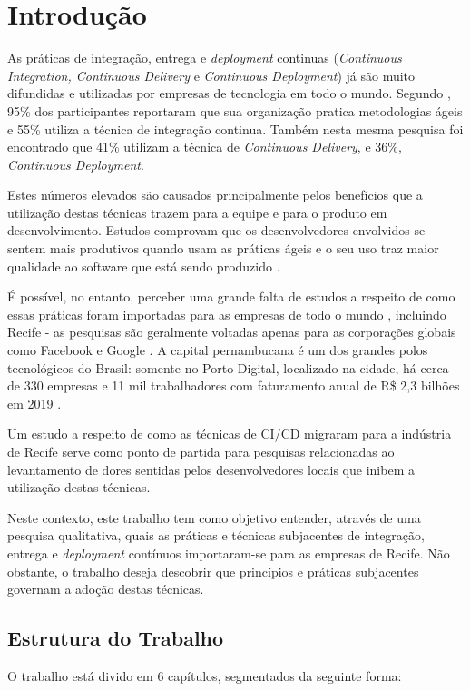 
\chapter{Introdução}

As práticas de integração, entrega e \emph{deployment} continuas (\emph{Continuous Integration, Continuous Delivery} e \emph{Continuous Deployment}) já são muito difundidas e utilizadas por empresas de tecnologia em todo o mundo. Segundo \cite{stateAgileReport2020}, 95\% dos participantes reportaram que sua organização pratica metodologias ágeis e 55\% utiliza a técnica de integração continua. Também nesta mesma pesquisa foi encontrado que 41\% utilizam a técnica de \emph{Continuous Delivery}, e 36\%, \emph{Continuous Deployment}.

Estes números elevados são causados principalmente pelos benefícios que a utilização destas técnicas trazem para a equipe e para o produto em desenvolvimento. Estudos comprovam que os desenvolvedores envolvidos se sentem mais produtivos quando usam as práticas ágeis \cite{hilton2016} e o seu uso traz maior qualidade ao software que está sendo produzido \cite{savor2015}. 

É possível, no entanto, perceber uma grande falta de estudos a respeito de como essas práticas foram importadas para as empresas de todo o mundo \cite{empiricalStudy2016}, incluindo Recife - as pesquisas são geralmente voltadas apenas para as corporações globais como Facebook \cite{savor2015} e Google \cite{googleCi}. A capital pernambucana é um dos grandes polos tecnológicos do Brasil: somente no Porto Digital, localizado na cidade, há cerca de 330 empresas e 11 mil trabalhadores com faturamento anual de R\$ 2,3 bilhões em 2019 \cite{portoDigital}.

Um estudo a respeito de como as técnicas de CI/CD migraram para a indústria de Recife serve como ponto de partida para pesquisas relacionadas ao levantamento de dores sentidas pelos desenvolvedores locais que inibem a utilização destas técnicas.

Neste contexto, este trabalho tem como objetivo entender, através de uma pesquisa qualitativa, quais as práticas e técnicas subjacentes de integração, entrega e \emph{deployment} contínuos importaram-se para as empresas de Recife. Não obstante, o trabalho deseja descobrir que princípios e práticas subjacentes governam a adoção destas técnicas.

\section{Estrutura do Trabalho}
 O trabalho está divido em 6 capítulos, segmentados da seguinte forma:

